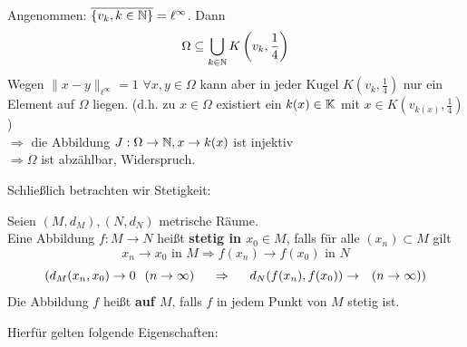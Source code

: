 \begin{beispiel}
\begin{enumerate}[label=\alph*\upshape)]
			Angenommen: $\overline{ \{v_{k}, k \in \mathbb{N} \} } = \ell^{\infty}$. Dann
			\[ \Omega \subseteq \bigcup_{k \in \mathbb{N}} K \left( v_{k}, \frac{1}{4} \right) \]
			Wegen $\| x - y\|_{\ell^{\infty}} = 1$ $\forall x, y \in \Omega$ kann aber in jeder Kugel $K(v_{k}, \frac{1}{4})$ nur ein Element auf $\Omega$ liegen. 
			(d.h. zu $x \in \Omega$ existiert ein $k(x) \in \mathbb{K}$ mit $x \in K(v_{k(x)}, \frac{1}{4})$) \\
			$\Rightarrow$ die Abbildung $ J : \Omega \rightarrow \mathbb{N}, x \rightarrow k(x)$ ist injektiv \\
			$\Rightarrow \Omega$ ist abzählbar, Widerspruch.
	\end{enumerate}
\end{beispiel}

Schlie{\ss}lich betrachten wir Stetigkeit:

\begin{definition}
	Seien $(M, d_{M}), (N, d_{N})$ metrische Räume. \\
	Eine Abbildung $f: M \rightarrow N$ hei{\ss}t \textbf{stetig in $x_{0} \in M$}, falls für alle $(x_{n}) \subset M$ gilt
	\[ x_{n} \rightarrow x_{0} \text{ in } M \Rightarrow f(x_{n}) \rightarrow f(x_{0}) \text{ in } N \]
	\[ (d_{M}(x_{n}, x_{0}) \rightarrow 0 \hspace{0.25cm} (n \rightarrow \infty) \hspace{0.5cm} \Rightarrow \hspace{0.5cm} d_{N}(f(x_{n}), f(x_{0})) \rightarrow \hspace{0.25cm} (n \rightarrow \infty)) \]
	Die Abbildung $f$ hei{\ss}t  \textbf{auf $M$}, falls $f$ in jedem Punkt von $M$ stetig ist.
\end{definition}

Hierfür gelten folgende Eigenschaften:

